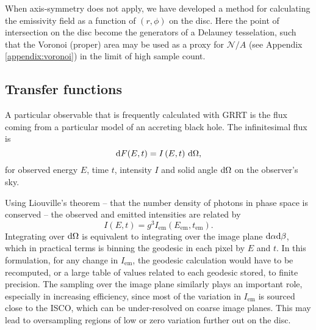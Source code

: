 When axis-symmetry does not apply, we have developed a method for calculating the emissivity field as a function of $(r, \phi)$ on the disc. Here the point of intersection on the disc become the generators of a Delauney tesselation, such that the Voronoi (proper) area may be used as a proxy for $\mathcal{N} / A$ (see Appendix \ref{appendix:voronoi}) in the limit of high sample count.

\subsection{Transfer functions}

A particular observable that is frequently calculated with GRRT is the flux coming from a particular model of an accreting black hole. The infinitesimal flux is
\begin{equation}
\text{d} F(E, t) = I\left(E, t\right)\, \text{d} \Omega,
\end{equation}
for observed energy $E$, time $t$, intensity $I$ and solid angle $\text{d} \Omega$ on the observer's sky.

Using Liouville's theorem -- that the number density of photons in phase space is conserved -- the observed and emitted intensities are related by
\begin{equation}
    I\left( E, t \right) = g^3 I_\text{em}\left(E_\text{em}, t_\text{em}\right).
\end{equation}
Integrating over $\text{d} \Omega$ is equivalent to integrating over the image plane $\text{d} \alpha \text{d} \beta$, which in practical terms is binning the geodesic in each pixel by $E$ and $t$. In this formulation, for any change in $I_\text{em}$, the geodesic calculation would have to be recomputed, or a large table of values related to each geodesic stored, to finite precision. The sampling over the image plane similarly plays an important role, especially in increasing efficiency, since most of the variation in $I_\text{em}$ is sourced close to the ISCO, which can be under-resolved on coarse image planes. This may lead to oversampling regions of low or zero variation further out on the disc.


